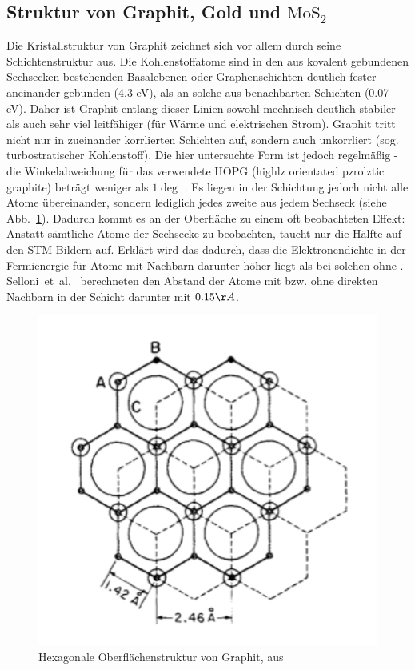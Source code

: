 \subsection{Struktur von Graphit, Gold und $\mathrm{MoS_2}$}
Die Kristallstruktur von Graphit zeichnet sich vor allem durch seine Schichtenstruktur 
aus. Die Kohlenstoffatome sind in den aus kovalent gebundenen Sechsecken bestehenden 
Basalebenen oder Graphenschichten deutlich fester aneinander gebunden (4.3 eV), als 
an solche aus benachbarten Schichten (0.07 eV). Daher ist Graphit entlang dieser Linien 
sowohl mechnisch deutlich stabiler als auch sehr viel leitfähiger (für Wärme und 
elektrischen Strom). Graphit tritt nicht nur in zueinander korrlierten Schichten auf, 
sondern auch unkorrliert (sog. turbostratischer Kohlenstoff). Die hier untersuchte Form 
ist jedoch regelmäßig - die Winkelabweichung für das verwendete HOPG (highlz orientated 
pzrolztic graphite) beträgt weniger als $1 \deg$ \cite{mcnaught2000iupac}. Es liegen in 
der Schichtung jedoch nicht alle Atome übereinander, sondern lediglich jedes zweite aus 
jedem Sechseck (siehe Abb.~\ref{fig:graphite}). 
Dadurch kommt es an der Oberfläche zu einem oft beobachteten 
Effekt: Anstatt sämtliche Atome der Sechsecke zu beobachten, taucht nur die Hälfte auf 
den STM-Bildern auf. Erklärt wird das dadurch, dass die Elektronendichte in der 
Fermienergie für Atome mit Nachbarn darunter höher liegt als bei solchen ohne
\cite{zeinalipour2008new}. Selloni~et~al.~\cite{Sellino1985} berechneten den Abstand 
der Atome mit bzw. ohne direkten Nachbarn in der Schicht darunter mit $0.15 \AA$. 

\begin{figure}
    \includegraphics[width=1.0\textwidth]{pics_theo/graphite}
    \caption{Hexagonale Oberflächenstruktur von Graphit, aus \cite{park1986tunneling}}
    \label{fig:graphite}
\end{figure} 

